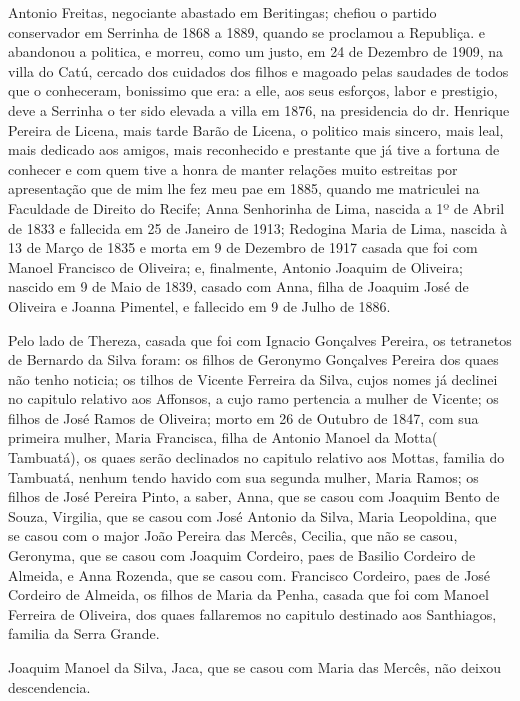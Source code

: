 Antonio Freitas, negociante abastado em Beritingas; chefiou o partido conservador em Serrinha de 1868 a 1889, quando se proclamou a Republiça. e abandonou a politica, e morreu, como um justo, em 24 de Dezembro de 1909, na villa do Catú, cercado dos cuidados dos filhos e magoado pelas saudades de todos que o conheceram, bonissimo que era: a elle, aos seus esforços, labor e prestigio, deve a Serrinha o ter sido elevada a villa em 1876, na presidencia do dr. Henrique Pereira de Licena, mais tarde Barão de Licena, o politico mais sincero, mais leal, mais dedicado aos amigos, mais reconhecido e prestante que já tive a fortuna de conhecer e com quem tive a honra de manter relações muito estreitas por apresentação que de mim lhe fez meu pae em 1885, quando me matriculei na Faculdade de Direito do Recife; Anna Senhorinha de Lima, nascida a 1º de Abril de 1833 e fallecida em 25 de Janeiro de 1913; Redogina Maria de Lima, nascida à 13 de Março de 1835 e morta em 9 de Dezembro de 1917
casada que foi com Manoel Francisco de Oliveira; e, finalmente, Antonio Joaquim de Oliveira; nascido em 9 de Maio de 1839, casado com Anna, filha de Joaquim José de Oliveira e Joanna Pimentel, e fallecido em 9 de Julho de 1886.

Pelo lado de Thereza, casada que foi com Ignacio Gonçalves Pereira, os tetranetos de Bernardo da Silva foram: os filhos de Geronymo Gonçalves Pereira dos quaes não tenho noticia; os tilhos de Vicente Ferreira da Silva, cujos nomes já declinei no capitulo relativo aos Affonsos, a cujo ramo pertencia a mulher de Vicente; os filhos de José Ramos de Oliveira; morto em 26 de Outubro de 1847, com sua primeira mulher, Maria Francisca, filha de Antonio Manoel da Motta( Tambuatá), os quaes serão declinados no capitulo relativo aos Mottas, familia do Tambuatá, nenhum tendo havido com sua segunda mulher, Maria Ramos; os filhos de José Pereira Pinto, a saber, Anna, que se casou com Joaquim Bento de Souza, Virgilia, que se casou com José Antonio da Silva, Maria Leopoldina, que se casou com o major João Pereira das Mercês, Cecilia, que não se casou, Geronyma, que se casou com Joaquim Cordeiro, paes de Basilio Cordeiro de Almeida, e Anna Rozenda, que se casou com. Francisco Cordeiro, paes de José Cordeiro de Almeida, os filhos de Maria da Penha, casada que foi com Manoel Ferreira de Oliveira, dos quaes fallaremos no
capitulo destinado aos Santhiagos, familia da Serra Grande.

Joaquim Manoel da Silva, Jaca, que se casou com Maria das Mercês, não deixou descendencia. %

